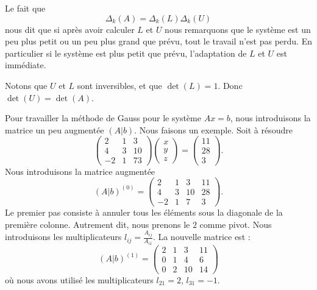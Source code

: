 \begin{normaltext}
    Le fait que
    \begin{equation}
        \Delta_k(A)=\Delta_k(L)\Delta_k(U)
    \end{equation}
    nous dit que si après avoir calculer \( L\) et \( U \) nous remarquons que le système est un peu plus petit ou un peu plus grand que prévu, tout le travail n'est pas perdu. En particulier si le système est plus petit que prévu, l'adaptation de \( L\) et \( U\) est immédiate.
\end{normaltext}

Notons que \( U\) et \( L\) sont inversibles, et que \( \det(L)=1\). Donc \( \det(U)=\det(A)\).

\begin{example}
    Pour travailler la méthode de Gauss pour le système \( Ax=b\), nous introduisons la matrice un peu augmentée \( (A|b)\). Nous faisons un exemple. Soit à résoudre
    \begin{equation}
        \begin{pmatrix}
             2   &   1    &   3       \\
             4   &   3    &   10     \\
             -2   &   1    &   7  3
         \end{pmatrix}
         \begin{pmatrix}
             x   \\
             y   \\
             z
         \end{pmatrix}=\begin{pmatrix}
             11   \\
             28   \\
             3
         \end{pmatrix}.
    \end{equation}
    Nous introduisons la matrice augmentée
    \begin{equation}
        (A|b)^{(0)}=\begin{pmatrix}
             2   &   1    &   3    &   11    \\
             4   &   3    &   10    &   28    \\
             -2   &   1    &   7    &   3
         \end{pmatrix}.
    \end{equation}
    Le premier pas consiste à annuler tous les éléments sous la diagonale de la première colonne. Autrement dit, nous prenons le \( 2\) comme pivot. Nous introduisons les multiplicateurs \( l_{ij}= \frac{ A_{ij} }{ A_{i1} }\). La nouvelle matrice est :
    \begin{equation}
        (A|b)^{(1)}=\begin{pmatrix}
             2   &   1    &   3    &   11    \\
             0   &   1    &   4    &   6    \\
             0   &   2    &   10    &   14
         \end{pmatrix}
    \end{equation}
    où nous avons utilisé les multiplicateurs \( l_{21}=2\), \( l_{31}=-1\).


\end{example}
